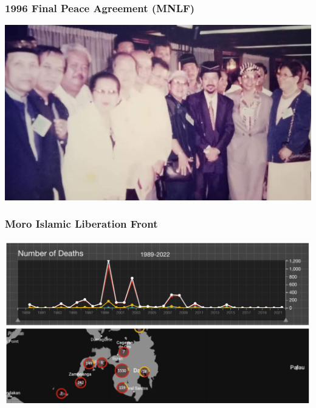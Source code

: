 \documentclass[aspectratio=43]{beamer}
\begin{document}
\begin{frame}
\frametitle{1996 Final Peace Agreement (MNLF)}
\centering

\includegraphics[width = \textwidth]{img/moro1996}

\end{frame}


\begin{frame}
\frametitle{Moro Islamic Liberation Front}
\centering

\includegraphics[width = \textwidth]{img/milf_uppsala}

\end{frame}
\end{document}
